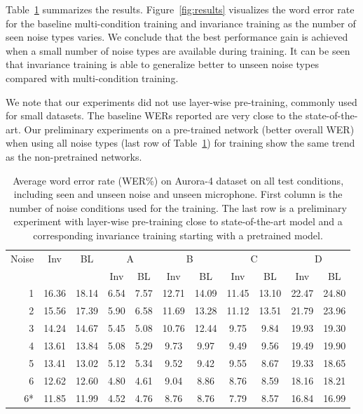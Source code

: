 \documentclass{article}
\begin{document}
Table~\ref{tab:results} summarizes the results. Figure~\ref{fig:results} visualizes the word error rate for the baseline multi-condition training and invariance training as the number of seen noise types varies. We conclude that the best performance
gain is achieved when a small number of noise types are available during training. It can be seen that invariance training is able to generalize better to unseen noise types compared with multi-condition training.

We note that our experiments did not use layer-wise pre-training, commonly used for small
datasets. The baseline WERs reported are very close to the state-of-the-art. %
Our preliminary experiments on a pre-trained network (better overall WER) when using all noise types (last row of Table~\ref{tab:results}) for training show the same trend as the non-pretrained networks.

\begin{table}
    \centering
    \caption{Average word error rate (WER\%) on Aurora-4 dataset on all test conditions,
        including seen and unseen noise and unseen microphone. First column
        is the number of noise conditions used for the training. The last row is a 
        preliminary experiment with layer-wise pre-training close to state-of-the-art
        model and a corresponding invariance training starting with a pretrained model.}
    \label{tab:results}
    \begin{tabular}{r|cc||cc|cc|cc|cc}
        Noise       &Inv&BL&  \multicolumn{2}{c|}{A} & \multicolumn{2}{c|}{B} & \multicolumn{2}{c|}{C} & \multicolumn{2}{c}{D}\\
               & & &  Inv & BL & Inv & BL & Inv & BL & Inv & BL\\
    \hline
    1           &16.36        &18.14 &6.54&7.57    &12.71& 14.09   & 11.45&   13.10    & 22.47 &   24.80    \\
    2           &15.56        &17.39 &5.90&  6.58 &   11.69   &13.28   &11.12   &13.51   &21.79   &23.96 \\
    3           &14.24        &14.67 &5.45 & 5.08&    10.76&   12.44&   9.75&    9.84 &   19.93&   19.30\\
    4           &13.61        &13.84 & 5.08 &5.29    &9.73    &9.97    &9.49    &9.56    &19.49   &19.90\\         
    5           &13.41        &13.02 & 5.12 &5.34    &9.52    &9.42    &9.55    &8.67    &19.33   &18.65\\         
    6           &12.62        &12.60 & 4.80 &4.61    &9.04    &8.86    &8.76    &8.59    &18.16   &18.21\\
    \hline\hline
    6* &11.85        &11.99    &4.52    &4.76    &8.76    &8.76    &7.79    &8.57    &16.84&    16.99
    \end{tabular}
\end{table}
\end{document}
